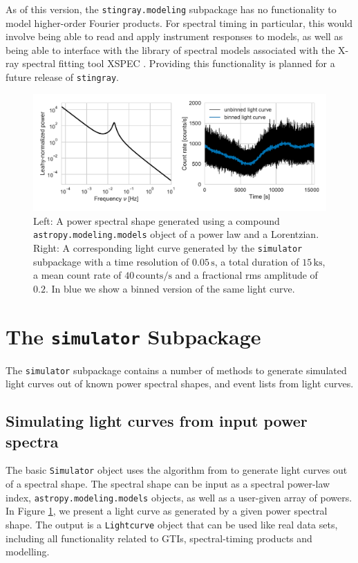 \documentclass[twocolumn]{aastex62}
\newcommand{\stingray}{\texttt{stingray}\xspace}
\begin{document}
As of this version, the \verb|stingray.modeling| subpackage has no functionality to model higher-order Fourier products. For spectral timing in particular, this would involve being able to read and apply instrument responses to models, as well as being able to interface with the library of spectral models associated with the X-ray spectral fitting tool XSPEC \citep{arnaud1996}. Providing this functionality is planned for a future release of \stingray. 



\begin{figure}[htbp]
\begin{center}
\includegraphics[width=\linewidth]{../figures/sim_lc.pdf}
\caption{Left: A power spectral shape generated using a compound \texttt{astropy.modeling.models} object of a power law and a Lorentzian. Right: A corresponding light curve generated by the \texttt{simulator} subpackage with a time resolution of $0.05\,\mathrm{s}$, a total duration of $15\,\mathrm{ks}$, a mean count rate of $40\,\mathrm{counts}/\mathrm{s}$ and a fractional rms amplitude of $0.2$. In blue we show a binned version of the same light curve.}
\label{fig:sim_lc}
\end{center}
\end{figure}

\section{The \texttt{simulator} Subpackage}
\label{sec:simulator}

The \texttt{simulator} subpackage contains a number of methods to generate simulated light curves out of known power spectral shapes, and event lists from light curves. 

\subsection{Simulating light curves from input power spectra}
The basic \texttt{Simulator} object uses the algorithm from \citet{timmer1995} to generate light curves out of a spectral shape. 
The spectral shape can be input as a spectral power-law index, \texttt{astropy.modeling.models} objects, as well as a user-given array of powers.
In Figure \ref{fig:sim_lc}, we present a light curve as generated by a given power spectral shape. 
The output is a \texttt{Lightcurve} object that can be used like real data sets, including all functionality related to GTIs, spectral-timing products and modelling. 
\end{document}
